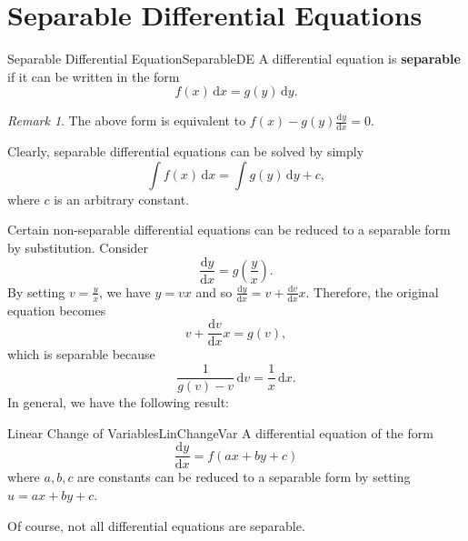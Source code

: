 \documentclass[math, code]{amznotes}
\theoremstyle{remark}
\newtheorem*{remark}{Remark}
\renewcommand{\d}{\mathrm{d}}
\begin{document}
\section{Separable Differential Equations}
\begin{dfnbox}{Separable Differential Equation}{SeparableDE}
    A differential equation is {\color{red} \textbf{separable}} if it can be written in the form
    \begin{equation*}
        f(x)\,\d x = g(y)\,\d y.
    \end{equation*}
\end{dfnbox}
\begin{notebox}
    \begin{remark}
        The above form is equivalent to $f(x) - g(y)\frac{\d y}{\d x} = 0$.
    \end{remark}
\end{notebox}
Clearly, separable differential equations can be solved by simply 
\begin{equation*}
    \int\!f(x)\,\d x = \int\!g(y)\,\d y + c,
\end{equation*}
where $c$ is an arbitrary constant. 

Certain non-separable differential equations can be reduced to a separable form by substitution. Consider
\begin{equation*}
    \frac{\d y}{\d x} = g\left(\frac{y}{x}\right).
\end{equation*}
By setting $v = \frac{y}{x}$, we have $y = vx$ and so $\frac{\d y}{\d x} = v + \frac{\d v}{\d x}x$. Therefore, the original equation becomes 
\begin{equation*}
    v + \frac{\d v}{\d x}x = g(v),
\end{equation*}
which is separable because
\begin{equation*}
    \frac{1}{g(v) - v}\,\d v = \frac{1}{x}\,\d x.
\end{equation*}
In general, we have the following result:
\begin{probox}{Linear Change of Variables}{LinChangeVar}
    A differential equation of the form 
    \begin{equation*}
        \frac{\d y}{\d x} = f(ax + by + c)
    \end{equation*}
    where $a, b, c$ are constants can be reduced to a separable form by setting $u = ax + by + c$.
\end{probox}
Of course, not all differential equations are separable. 
\end{document}
